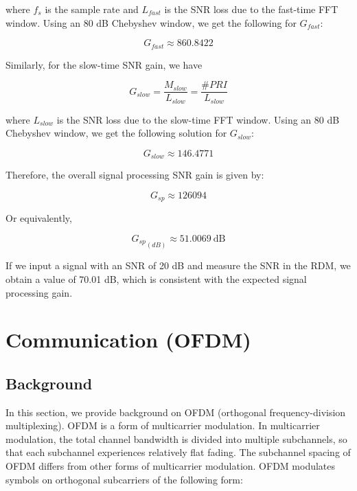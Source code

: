 \documentclass[conference]{IEEEtran}
\begin{document}
	where $f_s$ is the sample rate and $L_{fast}$ is the SNR loss due to the fast-time FFT window. Using an 80 dB Chebyshev window, we get the following for $G_{fast}$:
	
	\begin{equation}
		G_{fast} \approx 860.8422
	\end{equation}
	
	Similarly, for the slow-time SNR gain, we have
	
	\begin{equation}
		G_{slow} = \frac{M_{slow}}{L_{slow}} = \frac{\#PRI}{L_{slow}}
	\end{equation}
		
	where $L_{slow}$ is the SNR loss due to the slow-time FFT window. Using an 80 dB Chebyshev window, we get the following solution for $G_{slow}$:
	
	\begin{equation}
		G_{slow} \approx 146.4771
	\end{equation}
	
	Therefore, the overall signal processing SNR gain is given by:
	
	\begin{equation}
		G_{sp} \approx 126094
	\end{equation}
	
	Or equivalently,
	
	\begin{equation}
		 {G_{sp}}_{(dB)} \approx 51.0069\ \text{dB}
	\end{equation}
	
	If we input a signal with an SNR of 20 dB and measure the SNR in the RDM, we obtain a value of 70.01 dB, which is consistent with the expected signal processing gain.
		
     \section {Communication (OFDM)}
     
	 \subsection {Background}
	 
	 	In this section, we provide background on OFDM (orthogonal frequency-division multiplexing). OFDM is a form of multicarrier modulation. In multicarrier modulation, the total channel bandwidth is divided into multiple subchannels, so that each subchannel experiences relatively flat fading. The subchannel spacing of OFDM differs from other forms of multicarrier modulation. OFDM modulates symbols on orthogonal subcarriers of the following form:
	 	
\end{document}
